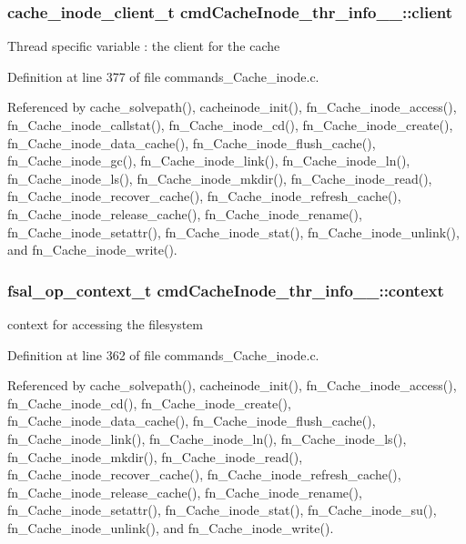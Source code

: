 \subsubsection{\setlength{\rightskip}{0pt plus 5cm}cache\_\-inode\_\-client\_\-t {\bf cmd\-Cache\-Inode\_\-thr\_\-info\_\-\_\-::client}}\label{structcmdCacheInode__thr__info_____o7}


Thread specific variable : the client for the cache 

Definition at line 377 of file commands\_\-Cache\_\-inode.c.

Referenced by cache\_\-solvepath(), cacheinode\_\-init(), fn\_\-Cache\_\-inode\_\-access(), fn\_\-Cache\_\-inode\_\-callstat(), fn\_\-Cache\_\-inode\_\-cd(), fn\_\-Cache\_\-inode\_\-create(), fn\_\-Cache\_\-inode\_\-data\_\-cache(), fn\_\-Cache\_\-inode\_\-flush\_\-cache(), fn\_\-Cache\_\-inode\_\-gc(), fn\_\-Cache\_\-inode\_\-link(), fn\_\-Cache\_\-inode\_\-ln(), fn\_\-Cache\_\-inode\_\-ls(), fn\_\-Cache\_\-inode\_\-mkdir(), fn\_\-Cache\_\-inode\_\-read(), fn\_\-Cache\_\-inode\_\-recover\_\-cache(), fn\_\-Cache\_\-inode\_\-refresh\_\-cache(), fn\_\-Cache\_\-inode\_\-release\_\-cache(), fn\_\-Cache\_\-inode\_\-rename(), fn\_\-Cache\_\-inode\_\-setattr(), fn\_\-Cache\_\-inode\_\-stat(), fn\_\-Cache\_\-inode\_\-unlink(), and fn\_\-Cache\_\-inode\_\-write().
\subsubsection{\setlength{\rightskip}{0pt plus 5cm}fsal\_\-op\_\-context\_\-t {\bf cmd\-Cache\-Inode\_\-thr\_\-info\_\-\_\-::context}}\label{structcmdCacheInode__thr__info_____o2}


context for accessing the filesystem 

Definition at line 362 of file commands\_\-Cache\_\-inode.c.

Referenced by cache\_\-solvepath(), cacheinode\_\-init(), fn\_\-Cache\_\-inode\_\-access(), fn\_\-Cache\_\-inode\_\-cd(), fn\_\-Cache\_\-inode\_\-create(), fn\_\-Cache\_\-inode\_\-data\_\-cache(), fn\_\-Cache\_\-inode\_\-flush\_\-cache(), fn\_\-Cache\_\-inode\_\-link(), fn\_\-Cache\_\-inode\_\-ln(), fn\_\-Cache\_\-inode\_\-ls(), fn\_\-Cache\_\-inode\_\-mkdir(), fn\_\-Cache\_\-inode\_\-read(), fn\_\-Cache\_\-inode\_\-recover\_\-cache(), fn\_\-Cache\_\-inode\_\-refresh\_\-cache(), fn\_\-Cache\_\-inode\_\-release\_\-cache(), fn\_\-Cache\_\-inode\_\-rename(), fn\_\-Cache\_\-inode\_\-setattr(), fn\_\-Cache\_\-inode\_\-stat(), fn\_\-Cache\_\-inode\_\-su(), fn\_\-Cache\_\-inode\_\-unlink(), and fn\_\-Cache\_\-inode\_\-write().
